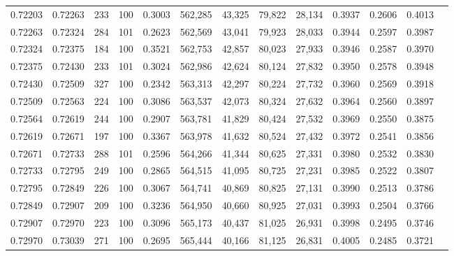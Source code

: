 \begin{tabular}{rrrrrrrrrrrrr}
0.72203 & 0.72263 &   233 & 100 &                                     0.3003 & 562,285 &  43,325 &  79,822 &  28,134 & 0.3937 & 0.2606 & 0.4013 \\
0.72263 & 0.72324 &   284 & 101 &                                     0.2623 & 562,569 &  43,041 &  79,923 &  28,033 & 0.3944 & 0.2597 & 0.3987 \\
0.72324 & 0.72375 &   184 & 100 &                                     0.3521 & 562,753 &  42,857 &  80,023 &  27,933 & 0.3946 & 0.2587 & 0.3970 \\
0.72375 & 0.72430 &   233 & 101 &                                     0.3024 & 562,986 &  42,624 &  80,124 &  27,832 & 0.3950 & 0.2578 & 0.3948 \\
0.72430 & 0.72509 &   327 & 100 &                                     0.2342 & 563,313 &  42,297 &  80,224 &  27,732 & 0.3960 & 0.2569 & 0.3918 \\
0.72509 & 0.72563 &   224 & 100 &                                     0.3086 & 563,537 &  42,073 &  80,324 &  27,632 & 0.3964 & 0.2560 & 0.3897 \\
0.72564 & 0.72619 &   244 & 100 &                                     0.2907 & 563,781 &  41,829 &  80,424 &  27,532 & 0.3969 & 0.2550 & 0.3875 \\
0.72619 & 0.72671 &   197 & 100 &                                     0.3367 & 563,978 &  41,632 &  80,524 &  27,432 & 0.3972 & 0.2541 & 0.3856 \\
0.72671 & 0.72733 &   288 & 101 &                                     0.2596 & 564,266 &  41,344 &  80,625 &  27,331 & 0.3980 & 0.2532 & 0.3830 \\
0.72733 & 0.72795 &   249 & 100 &                                     0.2865 & 564,515 &  41,095 &  80,725 &  27,231 & 0.3985 & 0.2522 & 0.3807 \\
0.72795 & 0.72849 &   226 & 100 &                                     0.3067 & 564,741 &  40,869 &  80,825 &  27,131 & 0.3990 & 0.2513 & 0.3786 \\
0.72849 & 0.72907 &   209 & 100 &                                     0.3236 & 564,950 &  40,660 &  80,925 &  27,031 & 0.3993 & 0.2504 & 0.3766 \\
0.72907 & 0.72970 &   223 & 100 &                                     0.3096 & 565,173 &  40,437 &  81,025 &  26,931 & 0.3998 & 0.2495 & 0.3746 \\
0.72970 & 0.73039 &   271 & 100 &                                     0.2695 & 565,444 &  40,166 &  81,125 &  26,831 & 0.4005 & 0.2485 & 0.3721 \\

\end{tabular}
